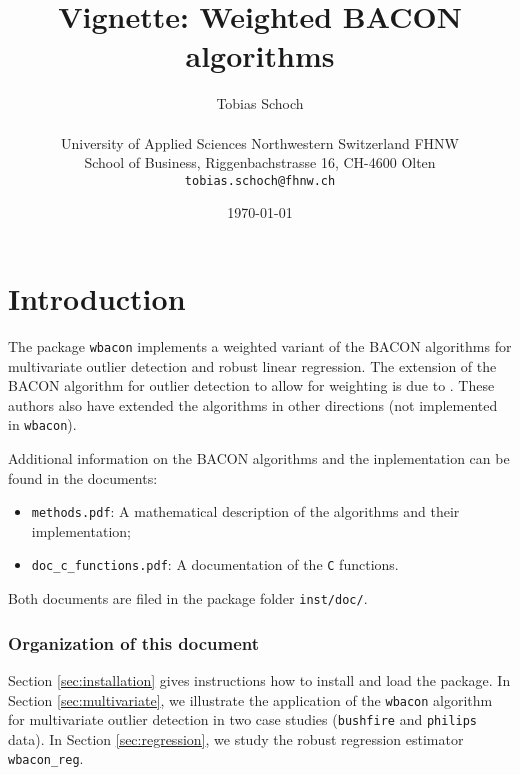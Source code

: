 \documentclass[a4paper,oneside,11pt,DIV=12]{scrartcl}
\newcommand{\code}[1]{{\texttt{#1}}}
\begin{document}
\title{\Large Vignette: Weighted BACON algorithms}

\author{{\normalsize Tobias Schoch} \\ 
\begin{minipage}[t][][t]{\textwidth}
	\begin{center}
	\small{University of Applied Sciences Northwestern Switzerland FHNW} \\
	\small{School of Business, Riggenbachstrasse 16, CH-4600 Olten} \\
	\small{\texttt{tobias.schoch{@}fhnw.ch}}
	\end{center}
\end{minipage}} 

\date{{\small \today}}
\maketitle


\section{Introduction}\label{sec:introduction}

The package \code{wbacon} implements a weighted variant of the BACON algorithms
\citep{billor_hadi_etal_2000} for multivariate outlier detection and robust
linear regression. The extension of the BACON algorithm for outlier detection
to allow for weighting is due to \citet{beguin_hulliger_2008}. These authors
also have extended the algorithms in other directions (not implemented in
\code{wbacon}). 

Additional information on the BACON algorithms and the inplementation can be
found in the documents:
\begin{itemize}
	\item \code{methods.pdf}: A mathematical description of the algorithms and
		their implementation;
	\item \code{doc\_c\_functions.pdf}: A documentation of the \code{C} 
		functions.
\end{itemize}
\noindent Both documents are filed in the package folder \code{inst/doc/}.

\subsubsection*{Organization of this document}
Section \ref{sec:installation} gives instructions how to install and load the
package.  In Section \ref{sec:multivariate}, we illustrate the application of
the \code{wbacon} algorithm for multivariate outlier detection in two case
studies (\code{bushfire} and \code{philips} data). In Section
\ref{sec:regression}, we study the robust regression estimator 
\code{wbacon\_reg}.
\end{document}
